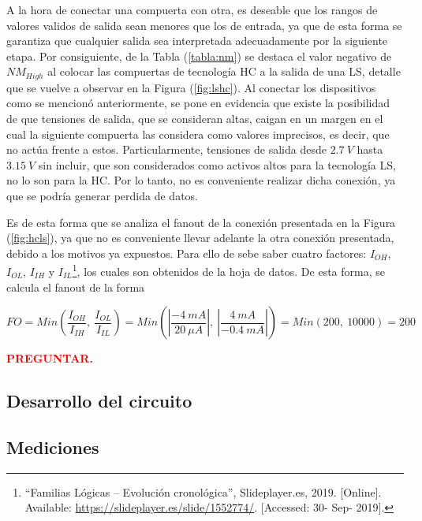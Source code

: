 A la hora de conectar una compuerta con otra, es deseable que los rangos de valores validos de salida sean menores que los de entrada, ya que de esta forma se garantiza que cualquier salida sea interpretada adecuadamente por la siguiente etapa. Por consiguiente, de la Tabla (\ref{tabla:nm}) se destaca el valor negativo de $NM_{High}$ al colocar las compuertas de tecnología HC a la salida de una LS, detalle que se vuelve a observar en la Figura (\ref{fig:lshc}). Al conectar los dispositivos como se mencionó anteriormente, se pone en evidencia que existe la posibilidad de que tensiones de salida, que se consideran altas, caigan en un margen en el cual la siguiente compuerta las considera como valores imprecisos, es decir, que no actúa frente a estos. Particularmente, tensiones de salida desde $2.7 \ V$ hasta $3.15 \ V$ sin incluir, que son considerados como activos altos para la tecnología LS, no lo son para la HC. Por lo tanto, no es conveniente realizar dicha conexión, ya que se podría generar perdida de datos.

Es de esta forma que se analiza el fanout de la conexión presentada en la Figura (\ref{fig:hcls}), ya que no es conveniente llevar adelante la otra conexión presentada, debido a los motivos ya expuestos. Para ello de sebe saber cuatro factores: $I_{OH}$, $I_{OL}$, $I_{IH}$ y $I_{IL}$\footnote{``Familias Lógicas – Evolución cronológica'', Slideplayer.es, 2019. [Online]. Available: \url{https://slideplayer.es/slide/1552774/}. [Accessed: 30- Sep- 2019].}, los cuales son obtenidos de la hoja de datos. De esta forma, se calcula el fanout de la forma

\begin{equation*}
	FO = Min \left( \frac{I_{OH}}{I_{IH}}, \ \frac{I_{OL}}{I_{IL}} \right) = Min \left( \left| \frac{-4 \ mA}{20 \ \mu A} \right|, \ \left| \frac{4 \ mA}{-0.4 \ mA}\right| \right) = Min \left( 200, \ 10000 \right) = 200
\end{equation*}

\begin{center}
	\textcolor{red}{\textbf{PREGUNTAR.}}
\end{center}

\subsection{Desarrollo del circuito}

\subsection{Mediciones}

